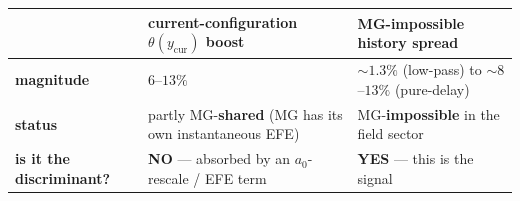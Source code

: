 \documentclass[
]{article}
\newcounter{none} %
\begin{document}
{\def\LTcaptype{none} %
\begin{longtable}[]{@{}
  >{\raggedright\arraybackslash}p{}
  >{\raggedright\arraybackslash}p{}
  >{\raggedright\arraybackslash}p{}@{}}
\toprule\noalign{}
\begin{minipage}[b]{\linewidth}\raggedright
\end{minipage} & \begin{minipage}[b]{\linewidth}\raggedright
current-configuration \(\theta(y_\mathrm{cur})\) boost
\end{minipage} & \begin{minipage}[b]{\linewidth}\raggedright
MG-impossible history spread
\end{minipage} \\
\midrule\noalign{}
\endhead
\bottomrule\noalign{}
\endlastfoot
\textbf{magnitude} & \(6\)--\(13\%\) & \(\sim1.3\%\) (low-pass) to
\(\sim8\)--\(13\%\) (pure-delay) \\
\textbf{status} & partly MG-\textbf{shared} (MG has its own
instantaneous EFE) & MG-\textbf{impossible} in the field sector \\
\textbf{is it the discriminant?} & \textbf{NO} --- absorbed by an
\(a_0\)-rescale / EFE term & \textbf{YES} --- this is the signal \\
\end{longtable}
}
\end{document}
